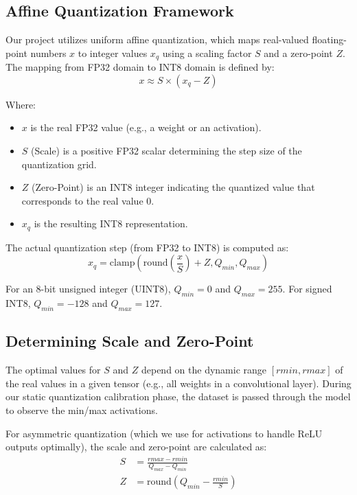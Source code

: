 \documentclass[11pt]{report}
\begin{document}
\subsection{Affine Quantization Framework}
Our project utilizes uniform affine quantization, which maps real-valued floating-point numbers $x$ to integer values $x_q$ using a scaling factor $S$ and a zero-point $Z$. The mapping from FP32 domain to INT8 domain is defined by:
\begin{equation} \label{eq:quant}
    x \approx S \times (x_q - Z)
\end{equation}

Where:
\begin{itemize}
    \item $x$ is the real FP32 value (e.g., a weight or an activation).
    \item $S$ (Scale) is a positive FP32 scalar determining the step size of the quantization grid.
    \item $Z$ (Zero-Point) is an INT8 integer indicating the quantized value that corresponds to the real value 0.
    \item $x_q$ is the resulting INT8 representation.
\end{itemize}

The actual quantization step (from FP32 to INT8) is computed as:
\begin{equation} \label{eq:quant_forward}
    x_q = \text{clamp}\left( \text{round}\left( \frac{x}{S} \right) + Z, Q_{min}, Q_{max} \right)
\end{equation}

For an 8-bit unsigned integer (UINT8), $Q_{min} = 0$ and $Q_{max} = 255$. For signed INT8, $Q_{min} = -128$ and $Q_{max} = 127$.

\subsection{Determining Scale and Zero-Point}
The optimal values for $S$ and $Z$ depend on the dynamic range $[rmin, rmax]$ of the real values in a given tensor (e.g., all weights in a convolutional layer). During our static quantization calibration phase, the dataset is passed through the model to observe the min/max activations.

For asymmetric quantization (which we use for activations to handle ReLU outputs optimally), the scale and zero-point are calculated as:
\begin{align}
    S &= \frac{rmax - rmin}{Q_{max} - Q_{min}} \\
    Z &= \text{round}\left( Q_{min} - \frac{rmin}{S} \right)
\end{align}
\end{document}
